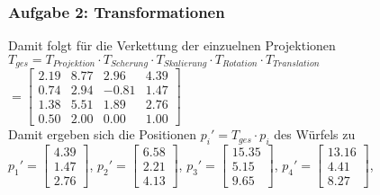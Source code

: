 \documentclass[accentcolor=tud9c,colorbacktitle,inverttitle,landscape,german,presentation,t]{tudbeamer}
\begin{document}
\begin{frame}
	\frametitle{Aufgabe 2: Transformationen}
	Damit folgt für die Verkettung der einzuelnen Projektionen\\
	$T_{ges}=T_{Projektion} \cdot T_{Scherung} \cdot T_{Skalierung} \cdot T_{Rotation} \cdot T_{Translation}$\\
	$=\begin{bmatrix}
	 2.19 &  8.77 &  2.96 &  4.39\\
	 0.74 &  2.94 & -0.81 &  1.47\\
	 1.38 &  5.51 &  1.89 &  2.76\\
	 0.50 &  2.00 &  0.00 &  1.00
	\end{bmatrix}$\\
	Damit ergeben sich die Positionen $p_i'=T_{ges} \cdot p_i $ des Würfels zu\\
	{\small 
	$p_1'=\begin{bmatrix}  4.39\\1.47 \\2.76 \end{bmatrix}$, %
	$p_2'=\begin{bmatrix}  6.58\\2.21 \\4.13 \end{bmatrix}$, %
	$p_3'=\begin{bmatrix}  15.35\\5.15 \\9.65 \end{bmatrix}$, %
	$p_4'=\begin{bmatrix}  13.16\\4.41 \\8.27 \end{bmatrix}$,\\ %
}
\end{frame}
\end{document}
